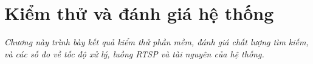 \chapter{Kiểm thử và đánh giá hệ thống}
\label{chapter:kiemthu}

\textit{Chương này trình bày kết quả kiểm thử phần mềm, đánh giá chất lượng tìm kiếm, và các số đo về tốc độ xử lý, luồng RTSP và tài nguyên của hệ thống.}




